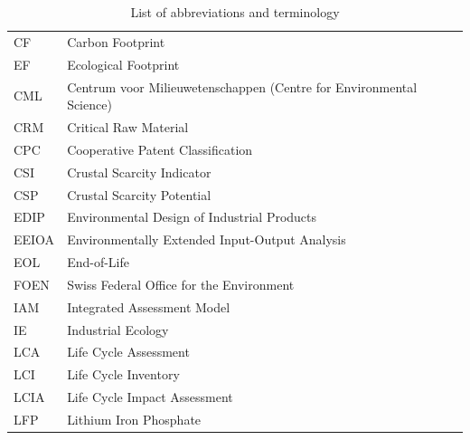 \documentclass[review,3p,authoryear]{elsarticle}
\begin{document}
\begin{table}[H]
    \centering
    \caption{List of abbreviations and terminology}\label{tab:abbreviations}
    \begin{tabular}{ll}
        \toprule
        CF                & Carbon Footprint                                                    \\
        EF                & Ecological Footprint                                                \\
        CML               & Centrum voor Milieuwetenschappen (Centre for Environmental Science) \\
        CRM               & Critical Raw Material                                               \\
        CPC               & Cooperative Patent Classification                                   \\
        CSI               & Crustal Scarcity Indicator                                          \\
        CSP               & Crustal Scarcity Potential                                          \\
        EDIP              & Environmental Design of Industrial Products                         \\
        EEIOA             & Environmentally Extended Input-Output Analysis                      \\
        EOL               & End-of-Life                                                         \\
        FOEN              & Swiss Federal Office for the Environment                            \\
        IAM               & Integrated Assessment Model                                         \\
        IE                & Industrial Ecology                                                  \\
        LCA               & Life Cycle Assessment                                               \\
        LCI               & Life Cycle Inventory                                                \\
        LCIA              & Life Cycle Impact Assessment                                        \\
        LFP               & Lithium Iron Phosphate                                              \\

\end{tabular}
\end{table}
\end{document}
